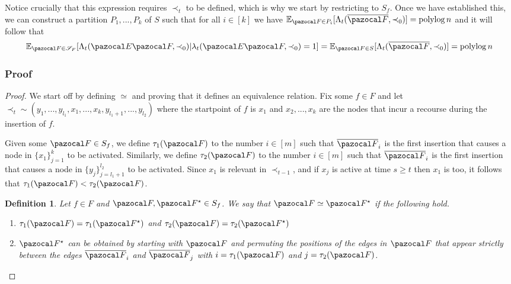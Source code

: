 \documentclass{report}
\newtheorem{definition}[theorem]{Definition}
\DeclareMathOperator*{\polylog}{polylog}
\begin{document}
Notice crucially that this expression requires $\prec_t$ to be defined, which is why we start by restricting to $S_f$. Once we have established this, we can construct a partition $P_1,...,P_k$ of $S$ such that for all $i \in [k]$ we have $\mathbb E_{\pazocal F \in P_i}[\Lambda_t(\overline{\pazocal F}, \prec_0)] = \polylog n$ and it will follow that
\[ \mathbb E_{\pazocal F \in \mathcal S_F} [\Lambda_t(\pazocal E \pazocal F, \prec_0) \vert \lambda_t(\pazocal E \pazocal F, \prec_0) = 1] = \mathbb E_{\pazocal F \in S} [\Lambda_t(\overline{\pazocal F}, \prec_0)]= \polylog n \]

\subsubsection{Proof}

\begin{proof}

We start off by defining $\simeq$ and proving that it defines an equivalence relation. Fix some $f \in F$ and let $\prec_t \sim (y_1,...,y_{l_1},x_1,...,x_k,y_{l_1+1},...,y_{l_2})$ where the startpoint of $f$ is $x_1$ and $x_2,...,x_k$ are the nodes that incur a recourse during the insertion of $f$.

Given some $\pazocal F \in S_f$, we define $\tau_1(\pazocal F)$ to the number $i \in [m]$ such that $\overline{\pazocal F}_i$ is the first insertion that causes a node in $\{x_1\}_{j=1}^{k}$ to be activated. Similarly, we define $\tau_2(\pazocal F)$ to the number $i \in [m]$ such that $\overline{\pazocal F}_i$ is the first insertion that causes a node in $\{y_j\}_{j=l_1+1}^{l_2}$ to be activated. Since $x_1$ is relevant in $\prec_{t-1}$, and if $x_j$ is active at time $s \geq t$ then $x_1$ is too, it follows that $\tau_1(\pazocal F) < \tau_2(\pazocal F)$.

\begin{definition}
Let $f \in F$ and $\pazocal F, \pazocal F^\star \in S_f$. We say that $\pazocal F \simeq \pazocal F^\star$ if the following hold.

\begin{enumerate}
    \item $\tau_1(\pazocal F) = \tau_1(\pazocal F^\star)$ and $\tau_2(\pazocal F) = \tau_2(\pazocal F^\star)$
    \item $\pazocal F^\star$ can be obtained by starting with $\pazocal F$ and permuting the positions of the edges in $\pazocal F$ that appear strictly between the edges $\overline{\pazocal F}_i$ and $\overline{\pazocal F}_j$ with $i=\tau_1(\pazocal F)$ and $j=\tau_2(\pazocal F)$.
\end{enumerate}
\end{definition}


\end{proof}
\end{document}
